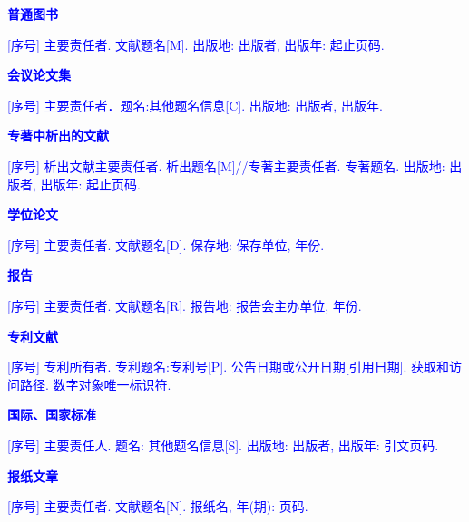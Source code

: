 \begin{bibprint}
\textcolor{blue}{\textbf{普通图书}}

\noindent\textcolor{blue}{[序号] 主要责任者. 文献题名[M]. 出版地: 出版者, 出版年: 起止页码. }
\cite{张伯伟2002全唐五代诗格会考, OBRIEN1994Aircraft}

\printbibliography [keyword={book},heading=none] 

\textcolor{blue}{\textbf{会议论文集}}

\noindent\textcolor{blue}{[序号] 主要责任者．题名:其他题名信息[C]. 出版地: 出版者, 出版年. }
\cite{雷光春2012}

\printbibliography [type=proceedings,heading=none] 

\textcolor{blue}{\textbf{专著中析出的文献}}

\noindent\textcolor{blue}{[序号] 析出文献主要责任者. 析出题名[M]//专著主要责任者. 专著题名. 出版地: 出版者, 出版年: 起止页码. }
\cite{白书农}

\printbibliography [type=inbook,heading=none] 

\textcolor{blue}{\textbf{学位论文}}

\noindent\textcolor{blue}{[序号] 主要责任者. 文献题名[D]. 保存地: 保存单位, 年份. }
\cite{zhanghesheng, Sobieski}

\printbibliography [keyword={thesis},heading=none] 

\textcolor{blue}{\textbf{报告}}

\noindent\textcolor{blue}{[序号] 主要责任者. 文献题名[R]. 报告地: 报告会主办单位, 年份. }
\cite{fengxiqiao, Sobieszczanski}

\printbibliography [keyword={techreport},heading=none] 

\textcolor{blue}{\textbf{专利文献}}

\noindent\textcolor{blue}{[序号] 专利所有者. 专利题名:专利号[P]. 公告日期或公开日期[引用日期]. 获取和访问路径. 数字对象唯一标识符.}
\cite{jiangxizhou}

\printbibliography [type=patent,heading=none] 

\textcolor{blue}{\textbf{国际、国家标准}}

\noindent\textcolor{blue}{[序号] 主要责任人. 题名: 其他题名信息[S]. 出版地: 出版者, 出版年: 引文页码.}
\cite{GB/T3792.4-2009}

\printbibliography [keyword={standard},heading=none] 

\textcolor{blue}{\textbf{报纸文章}}

\noindent\textcolor{blue}{[序号] 主要责任者. 文献题名[N]. 报纸名, 年(期): 页码. }
\cite{xiexide}


\end{bibprint}
